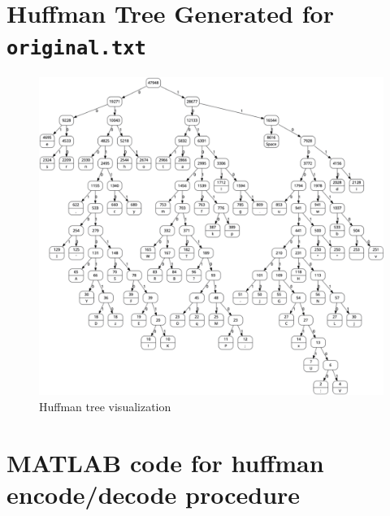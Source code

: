 \documentclass[12pt,twoside]{article}
\begin{document}
\begin{appendices}

\newpage
\section{Huffman Tree Generated for \texttt{original.txt}}
\label{app:huffmanTree}

\begin{figure}[h!]
    \centering
    \includegraphics[width=\textwidth]{huffmanTree.png}
    \caption{Huffman tree visualization}
    \label{fig:huffmanTree}
\end{figure}

\newpage
\section{MATLAB code for huffman encode/decode procedure}
\label{app:huffman}




\end{appendices}
\end{document}
